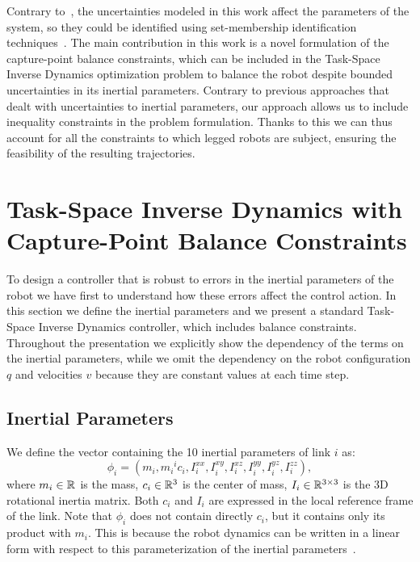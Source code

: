 Contrary to~\cite{Mordatch2015,Nguyen}, the uncertainties modeled in this work affect the parameters of the system, so they could be identified using set-membership identification techniques~\cite{Ramdani2005}.
The main contribution in this work is a novel formulation of the capture-point balance constraints, which can be included in the Task-Space Inverse Dynamics optimization problem to balance the robot despite bounded uncertainties in its inertial parameters.
Contrary to previous approaches that dealt with uncertainties to inertial parameters, our approach allows us to include inequality constraints in the problem formulation.
Thanks to this we can thus account for all the constraints to which legged robots are subject, ensuring the feasibility of the resulting trajectories.


\section{Task-Space Inverse Dynamics with Capture-Point Balance Constraints}
\label{sec:tsid}
To design a controller that is robust to errors in the inertial parameters of the robot we have first to understand how these errors affect the control action.
In this section we define the inertial parameters and we present a standard Task-Space Inverse Dynamics controller, which includes balance constraints. 
Throughout the presentation we explicitly show the dependency of the terms on the inertial parameters, while we omit the dependency on the robot configuration $q$ and velocities $v$ because they are constant values at each time step.

\subsection{Inertial Parameters}
We define the vector containing the 10 inertial parameters of link $i$ as:
\begin{equation*}
\phi_i = (m_i, m_i {}^i c_i, I_i^{xx}, I_i^{xy}, I_i^{xz}, I_i^{yy}, I_i^{yz}, I_i^{zz} ),
\end{equation*}
where $m_i \in \mathbb{R}^{}$ is the mass, $c_i \in \mathbb{R}^{3}$ is the center of mass, $I_i \in \mathbb{R}^{3\times 3}$ is the 3D rotational inertia matrix.
Both $c_i$ and $I_i$ are expressed in the local reference frame of the link.
Note that $\phi_i$ does not contain directly $c_i$, but it contains only its product with $m_i$.
This is because the robot dynamics can be written in a linear form with respect to this parameterization of the inertial parameters~\cite{Traversaro2015}.


